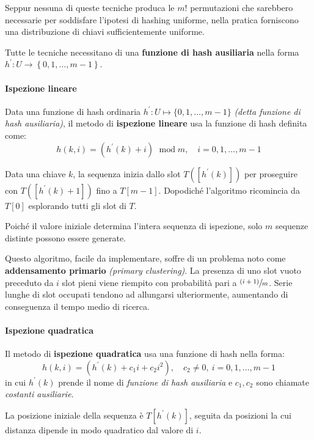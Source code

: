 \documentclass[italian, 10pt]{article}
\DeclareMathOperator{\modop}{\ mod}
\begin{document}
Seppur nessuna di queste tecniche produca le \(m!\) permutazioni che sarebbero necessarie per soddisfare l'ipotesi di hashing uniforme, nella pratica forniscono una distribuzione di chiavi sufficientemente uniforme.

Tutte le tecniche necessitano di una \textbf{funzione di hash ausiliaria} nella forma \(h^\prime : U \rightarrow \left\{0, 1, \ldots, m-1\right\}\).

\paragraph{Ispezione lineare}

Data una funzione di hash ordinaria \(h^\prime : U \mapsto \{0, 1, \ldots, m-1\}\) \textit{(detta funzione di hash ausiliaria)}, il metodo di \textbf{ispezione lineare} usa la funzione di hash definita come:
\[ h(k, i) = (h^\prime(k) + i) \modop m, \quad i = 0, 1, \ldots, m-1 \]

Data una chiave \(k\), la sequenza inizia dallo slot \(T\left([h^\prime (k)]\right)\) per proseguire con \(T\left([h^\prime (k) + 1]\right)\) fino a \(T[m-1]\).
Dopodiché l'algoritmo ricomincia da \(T[0]\) esplorando tutti gli slot di \(T\).

Poiché il valore iniziale determina l'intera sequenza di ispezione, solo \(m\) sequenze distinte possono essere generate.

\bigskip
Questo algoritmo, facile da implementare, soffre di un problema noto come \textbf{addensamento primario} \textit{(primary clustering)}.
La presenza di uno slot vuoto preceduto da \(i\) slot pieni viene riempito con probabilità pari a \(\sfrac{(i+1)}{m}\).
Serie lunghe di slot occupati tendono ad allungarsi ulteriormente, aumentando di conseguenza il tempo medio di ricerca.

\paragraph{Ispezione quadratica}

Il metodo di \textbf{ispezione quadratica} usa una funzione di hash nella forma:
\[ h(k, i) = \left(h^\prime(k) + c_1 i + c_2 i ^2\right), \quad c_2 \neq 0,\ i = 0, 1, \ldots, m-1 \]
in cui \(h^\prime( k)\) prende il nome di \textit{funzione di hash ausiliaria} e \(c_1, c_2\) sono chiamate \textit{costanti ausiliarie}.

La posizione iniziale della sequenza è \(T\left[h^\prime (k)\right]\), seguita da posizioni la cui distanza dipende in modo quadratico dal valore di \(i\).
\end{document}

